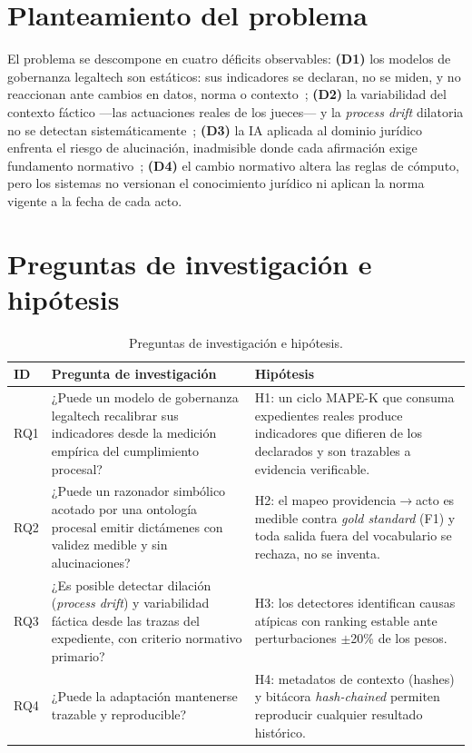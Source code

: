 \documentclass[a4paper,openany,12pt]{book}
\begin{document}
\section{Planteamiento del problema}
El problema se descompone en cuatro déficits observables: \textbf{(D1)} los modelos de gobernanza legaltech son estáticos: sus indicadores se declaran, no se miden, y no reaccionan ante cambios en datos, norma o contexto~\cite{janssen2016}; \textbf{(D2)} la variabilidad del contexto fáctico ---las actuaciones reales de los jueces--- y la \textit{process drift} dilatoria no se detectan sistemáticamente~\cite{aalst2012,bose2014}; \textbf{(D3)} la IA aplicada al dominio jurídico enfrenta el riesgo de alucinación, inadmisible donde cada afirmación exige fundamento normativo~\cite{garcez2023,governatori2022}; \textbf{(D4)} el cambio normativo altera las reglas de cómputo, pero los sistemas no versionan el conocimiento jurídico ni aplican la norma vigente a la fecha de cada acto.

\section{Preguntas de investigación e hipótesis}
\begin{table}[H]\centering\footnotesize
\caption{Preguntas de investigación e hipótesis.}\label{tab:rq}
\begin{tabular}{p{0.7cm}p{6.2cm}p{6.2cm}}\toprule
\textbf{ID} & \textbf{Pregunta de investigación} & \textbf{Hipótesis} \\ \midrule
RQ1 & ¿Puede un modelo de gobernanza legaltech recalibrar sus indicadores desde la medición empírica del cumplimiento procesal? & H1: un ciclo MAPE-K que consuma expedientes reales produce indicadores que difieren de los declarados y son trazables a evidencia verificable. \\
RQ2 & ¿Puede un razonador simbólico acotado por una ontología procesal emitir dictámenes con validez medible y sin alucinaciones? & H2: el mapeo providencia$\to$acto es medible contra \textit{gold standard} (F1) y toda salida fuera del vocabulario se rechaza, no se inventa. \\
RQ3 & ¿Es posible detectar dilación (\textit{process drift}) y variabilidad fáctica desde las trazas del expediente, con criterio normativo primario? & H3: los detectores identifican causas atípicas con ranking estable ante perturbaciones $\pm$20\% de los pesos. \\
RQ4 & ¿Puede la adaptación mantenerse trazable y reproducible? & H4: metadatos de contexto (hashes) y bitácora \textit{hash-chained} permiten reproducir cualquier resultado histórico. \\ \bottomrule
\end{tabular}\end{table}
\end{document}
